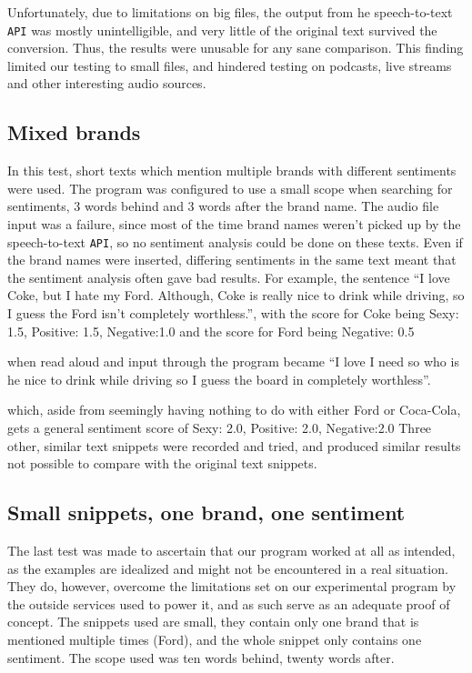 \documentclass[a4paper,12pt,twoside]{ltxdoc}
\begin{document}
Unfortunately, due to limitations on big files, the output from he speech-to-text \verb#API# was mostly unintelligible, and very little of the original text survived the conversion. Thus, the results were unusable for any sane comparison. This finding limited our testing to small files, and hindered testing on podcasts, live streams and other interesting audio sources.

\subsection{Mixed brands}
In this test, short texts which mention multiple brands with different sentiments were used. The program was configured to use a small scope when searching for sentiments, 3 words behind and 3 words after the brand name. The audio file input was a failure, since most of the time brand names weren't picked up by the speech-to-text \verb#API#, so no sentiment analysis could be done on these texts. Even if the brand names were inserted, differing sentiments in the same text meant that the sentiment analysis often gave bad results. For example, the sentence ``I love Coke, but I hate my Ford. Although, Coke is really nice to drink while driving, so I guess the Ford isn't completely worthless.'', with the score for Coke being 
Sexy: 1.5, Positive: 1.5, Negative:1.0
and the score for Ford being
Negative: 0.5

when read aloud and input through the program became ``I love I need so who is he nice to drink while driving so I guess the board in completely worthless''.

which, aside from seemingly having nothing to do with either Ford or Coca-Cola, gets a general sentiment score of 
Sexy: 2.0, Positive: 2.0, Negative:2.0
Three other, similar text snippets were recorded and tried, and produced similar results not possible to compare with the original text snippets.

\subsection{Small snippets, one brand, one sentiment}
The last test was made to ascertain that our program worked at all as intended, as the examples are idealized and might not be encountered in a real situation. They do, however, overcome the limitations set on our experimental program by the outside services used to power it, and as such serve as an adequate proof of concept. The snippets used are small, they contain only one brand that is mentioned multiple times (Ford), and the whole snippet only contains one sentiment. The scope used was ten words behind, twenty words after.
\end{document}
